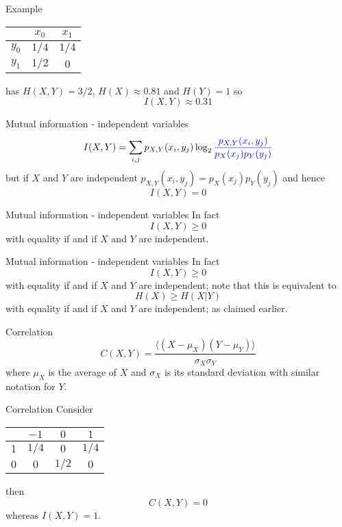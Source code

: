 \documentclass{beamer}
\newcommand{\crish}{\color{reddish}}
\newcommand{\cbla}{\color{black}}
\newcommand{\cblu}{\color{blue}}
\newcommand{\sm}{\color{reddish}$}
\newcommand{\fm}{$\color{black}{}}
\begin{document}
\begin{frame}{Example}

\begin{center}
\color{purple}
    \begin{tabular}{c|cc}
&$x_0$&$x_1$\\
\hline
$y_0$&$1/4$&$1/4$\\
$y_1$&$1/2$&$0$
    \end{tabular}
    \color{black}
\end{center}
has \sm{}H(X,Y)=3/2\fm{}, \sm{}H(X)\approx 0.81\fm{} and \sm{}H(Y)=1\fm{} so
\crish
$$
I(X,Y)\approx 0.31
$$
\cbla
\end{frame}


\begin{frame}{Mutual information - independent variables}
  \crish
  $$
  I(X,Y)=\sum_{i,j} p_{X,Y}(x_i,y_j)\log_2{\cblu\frac{p_{X,Y}(x_i,y_j)}{p_X(x_j)p_Y(y_j)}}
  $$
  \cbla
  but if \sm{}X\fm{} and \sm{}Y\fm{} are independent \cblu $p_{X,Y}(x_i,y_j)=p_X(x_j)p_Y(y_j)$\cbla{} and hence
    \crish
  $$
  I(X,Y)=0
  $$
  \cbla
\end{frame}


\begin{frame}{Mutual information - independent variables}
  In fact
  \crish
  $$
  I(X,Y)\ge 0
  $$
  \cbla
with equality if and if \sm{}X\fm{} and \sm{}Y\fm{} are independent.
\end{frame}


\begin{frame}{Mutual information - independent variables}
  In fact
    \crish
  $$
  I(X,Y)\ge 0
  $$
  \cbla
  with equality if and if \sm{}X\fm{} and \sm{}Y\fm{} are independent; note that this is equivalent to
    \crish
  $$
  H(X)\ge H(X|Y)
  $$
  \cbla
  with equality if and if \sm{}X\fm{} and \sm{}Y\fm{} are independent; as claimed earlier.
\end{frame}

\begin{frame}{Correlation}
  \crish
  $$
C(X,Y)=\frac{\langle (X-\mu_X)(Y-\mu_Y)\rangle}{\sigma_X\sigma_Y}
$$
\cbla
where \sm{}\mu_X\fm{} is the average of \sm{}X\fm{} and \sm{}\sigma_X\fm{} is its standard deviation with similar notation for \sm{}Y\fm{}.
\end{frame}

\begin{frame}{Correlation}
Consider
\begin{center}
\color{purple}
\begin{tabular}{c|ccc}
&$-1$&$0$&$1$\\
\hline
$1$&$1/4$&$0$  &$1/4$\\
$0$&$0$  &$1/2$&$0$
    \end{tabular}
    \color{black}
\end{center}
then
\crish
$$
C(X,Y)=0
$$
\cbla
whereas \cblu$I(X,Y)=1$\cbla.
\end{frame}
\end{document}
